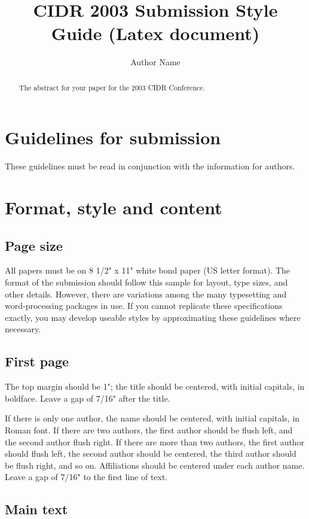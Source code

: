 \documentclass{cidr}
\title{CIDR 2003 Submission Style Guide (Latex document)}
\author{Author Name}
\begin{document}
\maketitle

\begin{abstract}
The abstract for your paper for the 2003 CIDR Conference.
\end{abstract}


\section{Guidelines for submission}

These guidelines must be read in conjunction with the information for
authors.

\section{Format, style and content}

\subsection{Page size}

All papers must be on 8 1/2" x 11" white bond paper (US letter format). 
The format of the submission should follow this sample for layout, type
sizes, and other details.  However, there are variations among the many
typesetting and word-processing packages in use.  If you cannot
replicate these specifications exactly, you may develop useable styles
by approximating these guidelines where necessary.


\subsection{First page}

The top margin should be 1"; the title should be centered, with initial
capitals, in boldface. Leave a gap of 7/16" after the title.

If there is only one author, the name should be centered, with initial
capitals, in Roman font. If there are two authors, the first author
should be flush left, and the second author flush right.  If there are
more than two authors, the first author should flush left, the second
author should be centered, the third author should be flush right, and
so on.  Affiliations should be centered under each author name. Leave a
gap of 7/16" to the first line of text.


\subsection{Main text}
\end{document}
